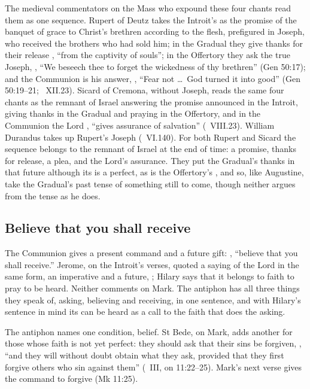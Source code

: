 The medieval commentators on the Mass who expound these four chants read them
as one sequence. Rupert of Deutz takes the Introit's  as the promise of the banquet of grace to Christ's brethren according
to the flesh, prefigured in Joseph, who received the brothers who had sold him; in the
Gradual they give thanks for their release ,
``from the captivity of souls''; in the Offertory they ask the true Joseph,
, ``We beseech thee to
forget the wickedness of thy brethren'' (Gen 50:17); and the Communion is his answer, , ``Fear not
\dots\ God turned it into good'' (Gen 50:19--21; ~XII.23). Sicard of Cremona, without Joseph, reads the same
four chants as the remnant of Israel answering the promise announced in the
Introit, giving thanks in the Gradual and praying in the Offertory, and in the
Communion the Lord , ``gives assurance of
salvation'' (~VIII.23). William Durandus takes up Rupert's
Joseph (~VI.140). For both Rupert and Sicard the sequence
belongs to the remnant of Israel at the end of time: a promise, thanks for
release, a plea, and the Lord's assurance. They put the Gradual's thanks in
that future although its  is a perfect, as is the
Offertory's , and so, like Augustine, take the Gradual's past
tense of something still to come, though neither argues from the tense as he
does.

\subsection{Believe that you shall receive}
\label{sec:awaited-communion}

The Communion gives a present command and a future gift: , ``believe that you shall receive.'' Jerome, on the Introit's
verses, quoted a saying of the Lord in the same form, an imperative and a
future, ; Hilary says that it belongs to faith to
pray to be heard. Neither comments on Mark. The antiphon has all three things
they speak of, asking, believing and receiving, in one sentence, and with
Hilary's sentence in mind its  can be heard as a call to the faith that
does the asking.

The antiphon names one condition, belief. St Bede, on Mark, adds another for
those whose faith is not yet perfect: they should ask that their sins be
forgiven, , ``and they will without doubt obtain
what they ask, provided that they first forgive others who sin against them''
(~III, on 11:22--25). Mark's next verse gives the command to
forgive (Mk 11:25).

